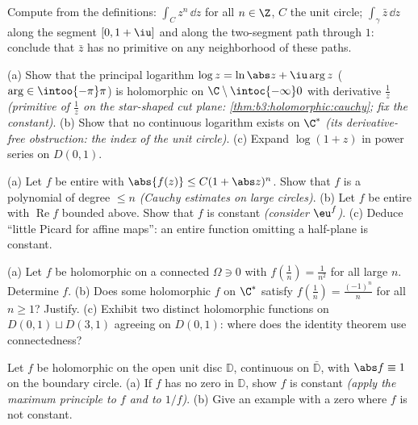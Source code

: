 \begin{exercise}[$\star$]\label{exo:b3:holomorphic:2}
Compute from the definitions: $\int_{C}z^n\,\dd z$ for all $n
\in \Z$, $C$ the unit circle; $\int_\gamma\bar z\,\dd z$ along
the segment $[0, 1+\iu]$ and along the two-segment path
through $1$: conclude that $\bar z$ has no primitive on any
neighborhood of these paths.
\end{exercise}

\begin{exercise}[$\star\star$]\label{exo:b3:holomorphic:3}
(a) Show that the principal logarithm $\log z = \ln\abs z +
\iu\arg z$ ($\arg \in \intoo{-\pi}\pi$) is holomorphic on
$\C\setminus\intoc{-\infty}0$ with derivative $\frac1z$
\emph{(primitive of $\frac1z$ on the star-shaped cut plane:
\cref{thm:b3:holomorphic:cauchy}; fix the constant)}.
(b) Show that no continuous logarithm exists on
$\C^*$ \emph{(its derivative-free obstruction: the index of
the unit circle)}.
(c) Expand $\log(1 + z)$ in power series on $D(0,1)$.
\end{exercise}

\begin{exercise}[$\star\star$]\label{exo:b3:holomorphic:4}
(a) Let $f$ be entire with $\abs{f(z)} \leq C(1 + \abs
z)^{n}$. Show that $f$ is a polynomial of degree $\leq n$
\emph{(Cauchy estimates on large circles)}.
(b) Let $f$ be entire with $\operatorname{Re}f$ bounded above.
Show that $f$ is constant \emph{(consider $\eu^{f}$)}.
(c) Deduce ``little Picard for affine maps'': an entire
function omitting a half-plane is constant.
\end{exercise}

\begin{exercise}[$\star\star$]\label{exo:b3:holomorphic:5}
(a) Let $f$ be holomorphic on a connected $\Omega \ni 0$ with
$f(\frac1n) = \frac1{n^2}$ for all large $n$. Determine $f$.
(b) Does some holomorphic $f$ on $\C^*$ satisfy $f(\frac1n) =
\frac{(-1)^n}{n}$ for all $n \geq 1$? Justify.
(c) Exhibit two distinct holomorphic functions on
$D(0,1)\sqcup D(3,1)$ agreeing on $D(0,1)$: where does the
identity theorem use connectedness?
\end{exercise}

\begin{exercise}[$\star\star$]\label{exo:b3:holomorphic:6}
Let $f$ be holomorphic on the open unit disc $\mathbb D$,
continuous on $\bar{\mathbb D}$, with $\abs f \equiv 1$ on the
boundary circle.
(a) If $f$ has no zero in $\mathbb D$, show $f$ is constant
\emph{(apply the maximum principle to $f$ and to $1/f$)}.
(b) Give an example with a zero where $f$ is not constant.
\end{exercise}

